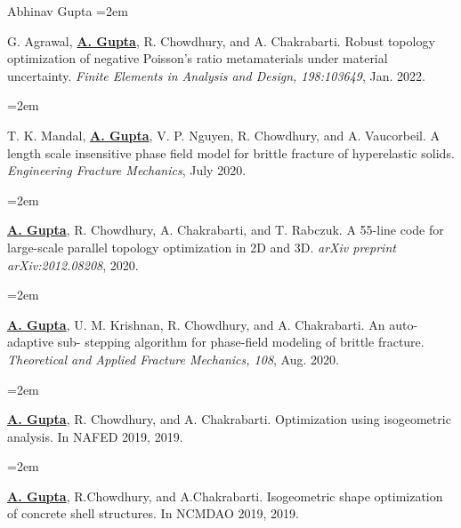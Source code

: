 \documentclass[  usegeometry%
]{scrartcl}
\newcommand{\MarginText}[1]{\marginpar{\raggedleft\itshape\small#1}} %
\newcommand{\Description}[1]{\hangindent=2em\hangafter=0\noindent\raggedright\footnotesize{#1}\par\normalsize\vspace{1em}} %
\begin{document}
\begin{cv}{{Abhinav Gupta}}
\vspace{-0.5em} %
\Description{G. Agrawal, \textbf{\underline{A. Gupta}}, R. Chowdhury, and A. Chakrabarti. Robust topology optimization of negative Poisson’s ratio metamaterials under material uncertainty. \emph{Finite Elements in Analysis and Design, 198:103649}, Jan. 2022. }



\vspace{-0.5em} %

\Description{T. K. Mandal, \textbf{\underline{A. Gupta}}, V. P. Nguyen, R. Chowdhury, and A. Vaucorbeil. A length scale insensitive phase field model for brittle fracture of hyperelastic solids. \emph{Engineering Fracture Mechanics}, July 2020.}

\vspace{-0.5em} %

\Description{\textbf{\underline{A. Gupta}}, R. Chowdhury, A. Chakrabarti, and T. Rabczuk. A 55-line code for large-scale parallel topology optimization in 2D and 3D. \emph{arXiv preprint arXiv:2012.08208}, 2020.}

\vspace{-0.5em} %

\Description{\textbf{\underline{A. Gupta}}, U. M. Krishnan, R. Chowdhury, and A. Chakrabarti. An auto-adaptive sub- stepping algorithm for phase-field modeling of brittle fracture. \emph{Theoretical and Applied Fracture Mechanics, 108}, Aug. 2020.}

\vspace{-0.5em} %



\Description{\MarginText{Conferences}\textbf{\underline{A. Gupta}}, R. Chowdhury, and A. Chakrabarti. Optimization using isogeometric analysis. In NAFED 2019, 2019.}

\vspace{-0.5em} %
\Description{\textbf{\underline{A. Gupta}}, R.Chowdhury, and A.Chakrabarti. Isogeometric shape optimization of concrete shell structures. In NCMDAO 2019, 2019.}


\end{cv}
\end{document}
